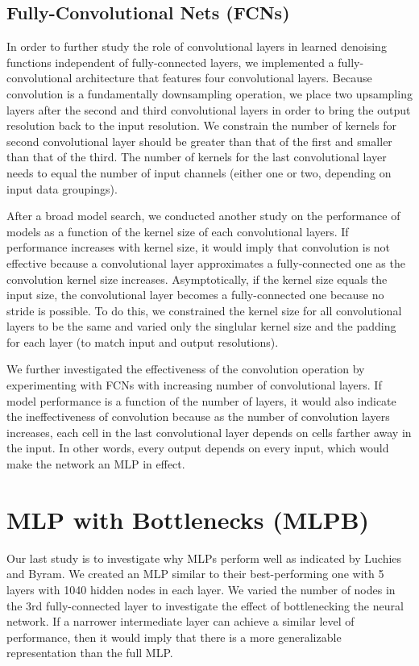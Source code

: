   \subsection{Fully-Convolutional Nets (FCNs)}

  In order to further study the role of convolutional layers in learned denoising functions independent of fully-connected layers, we implemented a fully-convolutional architecture that features four convolutional layers. Because convolution is a fundamentally downsampling operation, we place two upsampling layers after the second and third convolutional layers in order to bring the output resolution back to the input resolution. We constrain the number of kernels for second convolutional layer should be greater than that of the first and smaller than that of the third. The number of kernels for the last convolutional layer needs to equal the number of input channels (either one or two, depending on input data groupings).

  After a broad model search, we conducted another study on the performance of models as a function of the kernel size of each convolutional layers. If performance increases with kernel size, it would imply that convolution is not effective because a convolutional layer approximates a fully-connected one as the convolution kernel size increases. Asymptotically, if the kernel size equals the input size, the convolutional layer becomes a fully-connected one because no stride is possible. To do this, we constrained the kernel size for all convolutional layers to be the same and varied only the singlular kernel size and the padding for each layer (to match input and output resolutions).

  We further investigated the effectiveness of the convolution operation by experimenting with FCNs with increasing number of convolutional layers. If model performance is a function of the number of layers, it would also indicate the ineffectiveness of convolution because as the number of convolution layers increases, each cell in the last convolutional layer depends on cells farther away in the input. In other words, every output depends on every input, which would make the network an MLP in effect.


  \section{MLP with Bottlenecks (MLPB)}
  Our last study is to investigate why MLPs perform well as indicated by Luchies and Byram. We created an MLP similar to their best-performing one with 5 layers with 1040 hidden nodes in each layer. We varied the number of nodes in the 3rd fully-connected layer to investigate the effect of bottlenecking the neural network. If a narrower intermediate layer can achieve a similar level of performance, then it would imply that there is a more generalizable representation than the full MLP.



